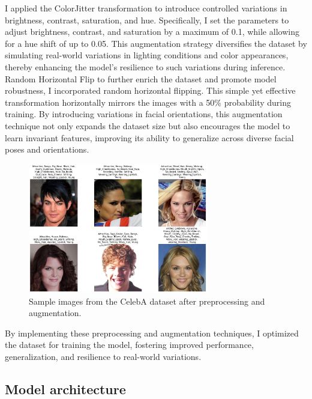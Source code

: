 \documentclass[a4paper,oneside]{article}
\begin{document}
I applied the ColorJitter transformation to introduce controlled variations in brightness, contrast, saturation, and hue.
Specifically, I set the parameters to adjust brightness, contrast, and saturation by a maximum of 0.1, while allowing for a hue shift of up to 0.05.
This augmentation strategy diversifies the dataset by simulating real-world variations in lighting conditions and color appearances, thereby enhancing the model's resilience to such variations during inference.
Random Horizontal Flip to further enrich the dataset and promote model robustness, I incorporated random horizontal flipping. This simple yet effective transformation horizontally mirrors the images with a 50\% probability during training.
By introducing variations in facial orientations, this augmentation technique not only expands the dataset size but also encourages the model to learn invariant features, improving its ability to generalize across diverse facial poses and orientations.

\begin{figure}[h]
  \includegraphics[width=0.7\textwidth]{DatasetSample.png}
  \centering
  \caption{Sample images from the CelebA dataset after preprocessing and augmentation.}
  \centering
\end{figure}


By implementing these preprocessing and augmentation techniques, I optimized the dataset for training the model, fostering improved performance, generalization, and resilience to real-world variations.

\subsection{Model architecture}
\label{sec:subsection_model_architecture}
\end{document}
